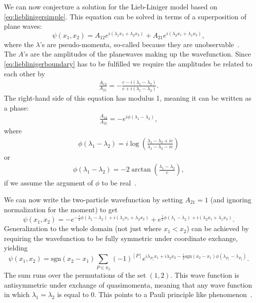 \documentclass[11pt, a4paper]{report} %
\begin{document}
We can now conjecture a solution for the Lieb-Liniger model based on \cref{eq:lieblinigersimple}.
This equation can be solved in terms of a superposition of plane waves:
\begin{equation}
	\psi(x_1,x_2) = A_{12} e^{i(\lambda_1x_1 + \lambda_2 x_2)} + A_{21} e^{i(\lambda_2 x_1 + \lambda_1 x_2)},
\end{equation}
where the \(\lambda\)'s are pseudo-momenta, so-called because they are unobservable~\cite{Franchini2017}.
The \(A\)'s are the amplitudes of the planewaves making up the wavefunction.
Since \cref{eq:lieblinigerboundary} has to be fulfilled we require the amplitudes be related to each other by
\begin{align}
	\frac{A_{12}}{A_{21}} = -\frac{c-i(\lambda_1 - \lambda_2) }{c+i(\lambda_1 - \lambda_2)}.
\end{align}
The right-hand side of this equation has modulus 1, meaning it can be written as a phase:
\begin{align}
	\frac{A_{12}}{A_{21}} = -e^{i\phi(\lambda_1-\lambda_2)},
\end{align}
where~\cite{Korepin1993}
\begin{align}
  \phi(\lambda_1-\lambda_2) = i \log(\frac{\lambda_1-\lambda_2 + ic}{\lambda_1-\lambda_2-ic})
\end{align}
or
\begin{align}
	\phi(\lambda_1-\lambda_2) = -2\arctan\left(\frac{\lambda_1-\lambda_2}{c}\right),
\end{align}
if we assume the argument of \(\phi\) to be real~\cite{Lieb1963}.

We can now write the two-particle wavefunction by setting \(A_{21}=1\) (and ignoring normalization for the moment) to get
\begin{equation}
	\psi(x_1,x_2) = - e^{-\frac{i}{2}\phi(\lambda_1-\lambda_2)+i(\lambda_1x_1 + \lambda_2 x_2)} + e^{\frac{i}{2}\phi(\lambda_1-\lambda_2)+i(\lambda_2 x_1 + \lambda_1 x_2)}.
\end{equation}
Generalization to the whole domain (not just where \(x_1 < x_2\)) can be achieved by requiring the wavefunction to be fully symmetric under coordinate exchange,
yielding
\begin{equation}
  \psi(x_1,x_2) = \textrm{sgn}(x_2-x_1)\sum_{P\in\pi_2} (-1)^{[P]} e^{i\lambda_{P_1}x_1 + i \lambda_2 x_2- \frac{i}{2} \textrm{sgn}(x_2-x_1)\phi(\lambda_{P_1}-\lambda_{P_2})}.
\end{equation}
The sum runs over the permutations of the set \((1,2)\).
This wave function is antisymmetric under exchange of quasimomenta, meaning that any wave function in which \(\lambda_1=\lambda_2\) is equal to 0.
This points to a Pauli principle like phenomenon~\cite{tofind}.
\end{document}
